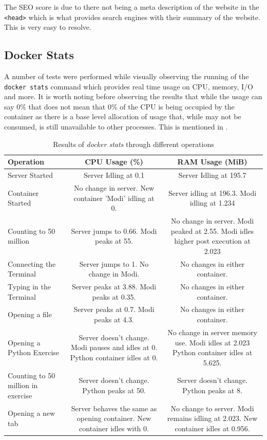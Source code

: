 The SEO score is due to there not being a meta description of the website in the \texttt{<head>} which is what provides search engines with their summary of the website. This is very easy to resolve. 

\subsection{Docker Stats} \label{test:perf-docker}

A number of tests were performed while visually observing the running of the \texttt{docker stats} command which provides real time usage on CPU, memory, I/O and more. It is worth noting before observing the results that while the usage can say 0\% that does not mean that 0\% of the CPU is being occupied by the container as there is a base level allocation of usage that, while may not be consumed, is still unavailable to other processes. This is mentioned in \cite{docker-perf}.

\begin{table}[h!]
    \centering
    \begin{tabulary}{\textwidth}{L|C|C}
        \textbf{Operation} & \textbf{CPU Usage (\%)} & \textbf{RAM Usage (MiB)}\\
        \hline
        Server Started & Server Idling at 0.1 & Server Idling at 195.7\\
        \hline
        Container Started & No change in server. New container 'Modi' idling at 0. & Server idling at 196.3. Modi idling at 1.234\\
        \hline
        Counting to 50 million & Server jumps to 0.66. Modi peaks at 55. & No change in server. Modi peaked at 2.55. Modi idles higher post execution at 2.023\\
        \hline
        Connecting the Terminal & Server jumps to 1. No change in Modi. & No changes in either container.\\
        \hline
        Typing in the Terminal & Server peaks at 3.88. Modi peaks at 0.35. & No changes in either container.\\
        \hline
        Opening a file & Server peaks at 0.7. Modi peaks at 4.3. & No changes in either container.\\
        \hline
        Opening a Python Exercise & Server doesn't change. Modi pauses and idles at 0. Python container idles at 0. & No change in server memory use. Modi idles at 2.023 Python container idles at 5.625.\\
        \hline
        Counting to 50 million in exercise & Server doesn't change. Python peaks at 50. & Server doesn't change. Python peaks at 8.\\
        \hline
        Opening a new tab & Server behaves the same as opening container. New container idles with 0. & No change to server. Modi remains idling at 2.023. New container idles at 0.956.
    \end{tabulary}
    \caption{Results of \textit{docker stats} through different operations}
\end{table}

